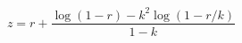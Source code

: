 \begin{equation} \label{rn-tortoise}
z = r + \frac{\log(1-r) - k^2\log(1-r/k)}{1-k}
\end{equation}

